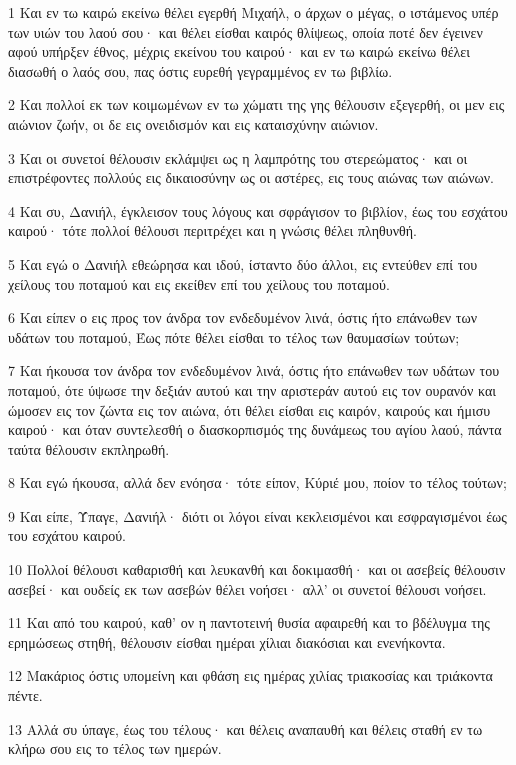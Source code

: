 \par 1 Και εν τω καιρώ εκείνω θέλει εγερθή Μιχαήλ, ο άρχων ο μέγας, ο ιστάμενος υπέρ των υιών του λαού σου· και θέλει είσθαι καιρός θλίψεως, οποία ποτέ δεν έγεινεν αφού υπήρξεν έθνος, μέχρις εκείνου του καιρού· και εν τω καιρώ εκείνω θέλει διασωθή ο λαός σου, πας όστις ευρεθή γεγραμμένος εν τω βιβλίω.
\par 2 Και πολλοί εκ των κοιμωμένων εν τω χώματι της γης θέλουσιν εξεγερθή, οι μεν εις αιώνιον ζωήν, οι δε εις ονειδισμόν και εις καταισχύνην αιώνιον.
\par 3 Και οι συνετοί θέλουσιν εκλάμψει ως η λαμπρότης του στερεώματος· και οι επιστρέφοντες πολλούς εις δικαιοσύνην ως οι αστέρες, εις τους αιώνας των αιώνων.
\par 4 Και συ, Δανιήλ, έγκλεισον τους λόγους και σφράγισον το βιβλίον, έως του εσχάτου καιρού· τότε πολλοί θέλουσι περιτρέχει και η γνώσις θέλει πληθυνθή.
\par 5 Και εγώ ο Δανιήλ εθεώρησα και ιδού, ίσταντο δύο άλλοι, εις εντεύθεν επί του χείλους του ποταμού και εις εκείθεν επί του χείλους του ποταμού.
\par 6 Και είπεν ο εις προς τον άνδρα τον ενδεδυμένον λινά, όστις ήτο επάνωθεν των υδάτων του ποταμού, Έως πότε θέλει είσθαι το τέλος των θαυμασίων τούτων;
\par 7 Και ήκουσα τον άνδρα τον ενδεδυμένον λινά, όστις ήτο επάνωθεν των υδάτων του ποταμού, ότε ύψωσε την δεξιάν αυτού και την αριστεράν αυτού εις τον ουρανόν και ώμοσεν εις τον ζώντα εις τον αιώνα, ότι θέλει είσθαι εις καιρόν, καιρούς και ήμισυ καιρού· και όταν συντελεσθή ο διασκορπισμός της δυνάμεως του αγίου λαού, πάντα ταύτα θέλουσιν εκπληρωθή.
\par 8 Και εγώ ήκουσα, αλλά δεν ενόησα· τότε είπον, Κύριέ μου, ποίον το τέλος τούτων;
\par 9 Και είπε, Ύπαγε, Δανιήλ· διότι οι λόγοι είναι κεκλεισμένοι και εσφραγισμένοι έως του εσχάτου καιρού.
\par 10 Πολλοί θέλουσι καθαρισθή και λευκανθή και δοκιμασθή· και οι ασεβείς θέλουσιν ασεβεί· και ουδείς εκ των ασεβών θέλει νοήσει· αλλ' οι συνετοί θέλουσι νοήσει.
\par 11 Και από του καιρού, καθ' ον η παντοτεινή θυσία αφαιρεθή και το βδέλυγμα της ερημώσεως στηθή, θέλουσιν είσθαι ημέραι χίλιαι διακόσιαι και ενενήκοντα.
\par 12 Μακάριος όστις υπομείνη και φθάση εις ημέρας χιλίας τριακοσίας και τριάκοντα πέντε.
\par 13 Αλλά συ ύπαγε, έως του τέλους· και θέλεις αναπαυθή και θέλεις σταθή εν τω κλήρω σου εις το τέλος των ημερών.



